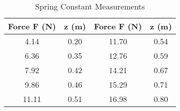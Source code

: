 \begin{appendix}
	\begin{table}[H]
		\centering
		\begin{tabular}{c|c||c|c}
			Force F (N) & z (m) & Force F (N) & z (m) \\
			\hline\hline
			4.14 & 0.20 & 11.70 & 0.54 \\ \hline
			6.36 & 0.35 & 12.76 & 0.59 \\ \hline
			7.92 & 0.42 & 14.21 & 0.67 \\ \hline
			9.86 & 0.46 & 15.29 & 0.71 \\ \hline
			11.11 & 0.51 & 16.98 & 0.80 \\ \hline
		\end{tabular}
		\caption{Spring Constant Measurements}
		\label{tab:Spring_Constant_Measurements}
	\end{table}


\end{appendix}

